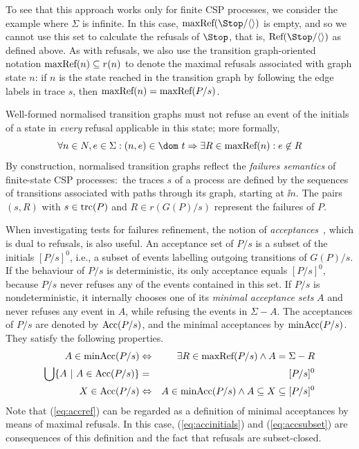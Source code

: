To see that this approach works only for finite CSP processes, we consider
the example where $\Sigma$ is infinite. In this case,
$\maxrefs(\Stop/\langle\rangle)$ is empty, and so we cannot use this set to
calculate the refusals of $\Stop$, that is, $\refs(\Stop/\langle\rangle)$ as
defined above. As with refusals, we also use the transition graph-oriented
notation $\text{maxRef}(n) \subseteq r(n)$ to denote the maximal refusals
associated with graph state $n$: if $n$ is the state reached in the
transition graph by following the edge labels in trace $s$, then $\text{maxRef}(n)
= \text{maxRef}(P/s)$.

Well-formed normalised transition graphs must not refuse an event of the
initials of a state in {\it every} refusal applicable in this state; more
formally,
%
\begin{equation}
\label{eq:wellformedg}
\forall n\in N, e\in\Sigma: (n,e)\in\dom~t \Rightarrow
\exists R\in \maxrefs(n): e\not\in R
\end{equation}
%
By construction, normalised transition graphs reflect the \emph{failures
semantics} of finite-state CSP processes:~the traces $s$ of a process are
defined by the sequences of transitions associated with paths through its
graph, starting at $\ii n$. The pairs $(s,R)$ with $s\in\text{trc}(P)$ and $R\in
r(G(P)/s)$ represent the failures of $P$.

When investigating  tests for failures refinement, the notion of
\emph{acceptances}~\cite{Hennessy:1988:ATP:50497}, which is dual to refusals,
is also useful. An acceptance set of $P/s$ is a subset of the initials
$[P/s]^0$, i.e., a subset of events labelling  outgoing transitions of
$G(P)/s$. If the behaviour of  $P/s$ is deterministic, its only acceptance
equals $[P/s]^0$, because $P/s$ never refuses any of the events contained in
this set. If $P/s$ is nondeterministic, it internally chooses one of its
\emph{minimal acceptance sets} $A$ and never refuses any event in $A$, while
refusing the events in $\Sigma-A$. The acceptances of $P/s$ are denoted by
$\text{Acc}(P/s)$, and the minimal acceptances by $\text{minAcc}(P/s)$. They satisfy
the following properties.
%
\begin{eqnarray}
A\in \text{minAcc}(P/s) & \Leftrightarrow & \exists R\in\text{maxRef}(P/s) \wedge A = \Sigma-R
\label{eq:accref}
\\
\bigcup \{ A~|~A\in \text{Acc}(P/s)\} & = & [P/s]^0
\label{eq:accinitials}
\\
 X\in\text{Acc}(P/s) &\Leftrightarrow & A\in \text{minAcc}(P/s) \wedge A\subseteq X \subseteq [P/s]^0
 \label{eq:accsubset}
\end{eqnarray}
%
Note that (\ref{eq:accref}) can be regarded as a definition of minimal
acceptances by means of maximal refusals. In this case,
(\ref{eq:accinitials}) and (\ref{eq:accsubset}) are consequences of this
definition and the fact that refusals are subset-closed. 

